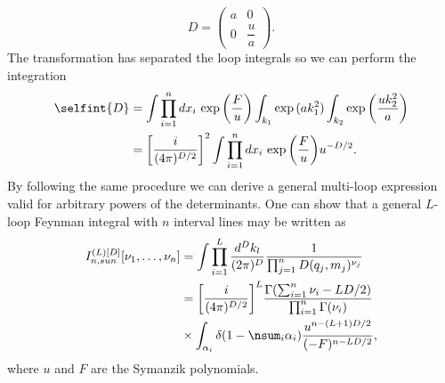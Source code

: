 \begin{equation}
    D = 
    \begin{pmatrix}
        a & 0 \\
        0 & \dfrac{u}{a}
    \end{pmatrix}.
\end{equation}
The transformation has separated the loop integrals so we can perform the integration
\begin{equation}
    \begin{split}
        \selfint{D} &= \int\prod_{i=1}^n dx_i\,\exp{\bigg(\frac{F}{u}\bigg)} \int_{k_1}\exp{(ak_1^2)}\int_{k_2}\exp{\bigg(\frac{uk_2^2}{a}\bigg)} \\
        &= \bigg[\frac{i}{(4\pi)^{D/2}}\bigg]^2\int\prod_{i=1}^n dx_i\,\exp{\bigg(\frac{F}{u}\bigg)}u^{-D/2}.
    \end{split}
\end{equation}
By following the same procedure we can derive a general multi-loop expression valid for arbitrary powers of the determinants. One can show that a general $L$-loop Feynman integral with $n$ interval lines may be written as
\begin{equation}
    \begin{split}
        I_{n,sun}^{(L)[D]}[\nu_1,\dots,\nu_n] &= \int\prod_{i=1}^L\frac{d^Dk_l}{(2\pi)^D}\frac{1}{\prod_{j=1}^nD(q_j,m_j)^{\nu_j}} \\
        &= \bigg[\frac{i}{(4\pi)^{D/2}}\bigg]^L\frac{\Gamma(\sum_{i=1}^n\nu_i - LD/2)}{\prod_{i=1}^n\Gamma(\nu_i)} \\
        &\times\int_{\alpha_i}\delta(1 - \nsum_i\alpha_i)\frac{u^{n-(L+1)D/2}}{(-F)^{n-LD/2}},
    \end{split} 
\end{equation}
where $u$ and $F$ are the Symanzik polynomials. 
